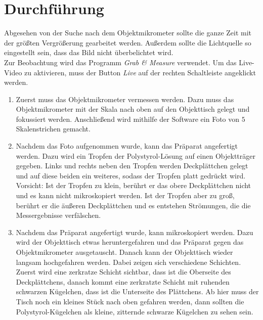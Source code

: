 \section*{Durchführung}

Abgesehen von der Suche nach dem Objektmikrometer sollte die ganze Zeit mit der größten Vergrößerung gearbeitet werden. Außerdem sollte die Lichtquelle so eingestellt sein, dass das Bild nicht überbelichtet wird. \\
Zur Beobachtung wird das Programm \emph{Grab \& Measure} verwendet. Um das Live-Video zu aktivieren, muss der Button \emph{Live} auf der rechten Schaltleiste angeklickt werden.
\begin{enumerate}

  \item Zuerst muss das Objektmikrometer vermessen werden. Dazu muss das Objektmikrometer mit der Skala nach oben auf den Objekttisch gelegt und fokussiert werden. Anschließend wird mithilfe der Software ein Foto von $5$ Skalenstrichen gemacht.

  \item Nachdem das Foto aufgenommen wurde, kann das Präparat angefertigt werden. Dazu wird ein Tropfen der Polystyrol-Lösung auf einen Objektträger gegeben. Links und rechts neben den Tropfen werden Deckplättchen gelegt und auf diese beiden ein weiteres, sodass der Tropfen platt gedrückt wird. Vorsicht: Ist der Tropfen zu klein, berührt er das obere Deckplättchen nicht und es kann nicht mikroskopiert werden. Ist der Tropfen aber zu groß, berührt er die äußeren Deckplättchen und es entstehen Strömungen, die die Messergebnisse verfälschen.

  \item Nachdem das Präparat angefertigt wurde, kann mikroskopiert werden. Dazu wird der Objekttisch etwas heruntergefahren und das Präparat gegen das Objektmikrometer ausgetauscht. Danach kann der Objekttisch wieder langsam hochgefahren werden. Dabei zeigen sich verschiedene Schichten. Zuerst wird eine zerkratze Schicht sichtbar, dass ist die Oberseite des Deckplättchens, danach kommt eine zerkratzte Schicht mit ruhenden schwarzen Kügelchen, dass ist die Unterseite des Plättchens. Ab hier muss der Tisch noch ein kleines Stück nach oben gefahren werden, dann sollten die Polystyrol-Kügelchen als kleine, zitternde schwarze Kügelchen zu sehen sein.


\end{enumerate}
